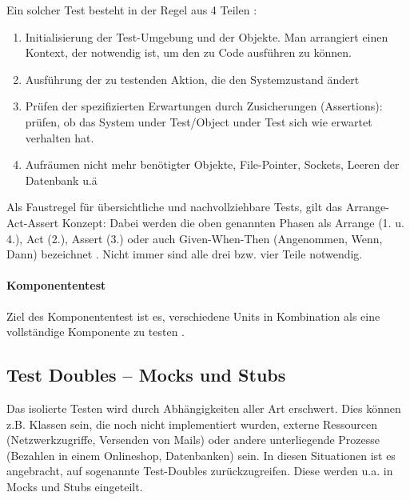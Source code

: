 Ein solcher Test besteht in der Regel aus 4 Teilen \citep{rappin_rails_2011} \citep[Karte 46]{langr_agile_2011}:
\begin{enumerate}
 \item Initialisierung der Test-Umgebung und der Objekte. Man arrangiert einen Kontext, der notwendig ist, um den zu Code ausführen zu können.
 \item Ausführung der zu testenden Aktion, die den Systemzustand ändert
 \item Prüfen der spezifizierten Erwartungen durch Zusicherungen (Assertions): prüfen, ob das System under Test/Object under Test sich wie erwartet verhalten hat.
 \item Aufräumen nicht mehr benötigter Objekte, File-Pointer, Sockets, Leeren der Datenbank u.ä 
\end{enumerate}
Als Faustregel für übersichtliche und nachvollziehbare Tests, gilt das Arrange-Act-Assert Konzept: Dabei werden die oben genannten Phasen als Arrange (1. u. 4.), Act (2.), Assert (3.) oder auch Given-When-Then (Angenommen, Wenn, Dann) bezeichnet \citep[Karte 46]{langr_agile_2011}. Nicht immer sind alle drei bzw. vier Teile notwendig.

\paragraph{Komponententest}
Ziel des Komponententest ist es, verschiedene Units in Kombination als eine vollständige Komponente zu testen \citep{goodliffe_code_2006}.

 \subsection{Test Doubles -- Mocks und Stubs}
  \label{sec:mocks}
  Das isolierte Testen wird durch Abhängigkeiten aller Art erschwert. Dies können z.B. Klassen sein, die noch nicht implementiert wurden, externe Ressourcen (Netzwerkzugriffe, Versenden von Mails) oder andere unterliegende Prozesse (Bezahlen in einem Onlineshop, Datenbanken) sein. In diesen Situationen ist es angebracht, auf sogenannte Test-Doubles zurückzugreifen. Diese werden u.a. in Mocks und Stubs eingeteilt.
  
